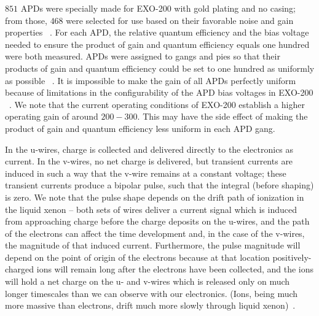 $851$ APDs were specially made for EXO-200 with gold plating and no casing; from those, $468$ were selected for use based on their favorable noise and gain properties ~\cite{EXOLAAPD}.  For each APD, the relative quantum efficiency and the bias voltage needed to ensure the product of gain and quantum efficiency equals one hundred were both measured.  APDs were assigned to gangs and pies so that their products of gain and quantum efficiency could be set to one hundred as uniformly as possible ~\cite{APDMeasurementAndGanging}.  It is impossible to make the gain of all APDs perfectly uniform because of limitations in the configurability of the APD bias voltages in EXO-200 ~\cite{detectorPartI}.  We note that the current operating conditions of EXO-200 establish a higher operating gain of around $200-300$. This may have the side effect of making the product of gain and quantum efficiency less uniform in each APD gang.

In the u-wires, charge is collected and delivered directly to the electronics as current.  In the v-wires, no net charge is delivered, but transient currents are induced in such a way that the v-wire remains at a constant voltage; these transient currents produce a bipolar pulse, such that the integral (before shaping) is zero.  We note that the pulse shape depends on the drift path of ionization in the liquid xenon -- both sets of wires deliver a current signal which is induced from approaching charge before the charge deposits on the u-wires, and the path of the electrons can affect the time development and, in the case of the v-wires, the magnitude of that induced current.  Furthermore, the pulse magnitude will depend on the point of origin of the electrons because at that location positively-charged ions will remain long after the electrons have been collected, and the ions will hold a net charge on the u- and v-wires which is released only on much longer timescales than we can observe with our electronics.  (Ions, being much more massive than electrons, drift much more slowly through liquid xenon)~\cite{EnergyDocumentRun2a,MCDocumentRun2a}.

